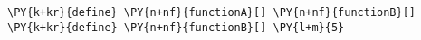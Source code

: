 \begin{Verbatim}[commandchars=\\\{\}]
\PY{k+kr}{define} \PY{n+nf}{functionA}[] \PY{n+nf}{functionB}[]
\PY{k+kr}{define} \PY{n+nf}{functionB}[] \PY{l+m}{5}
\end{Verbatim}
